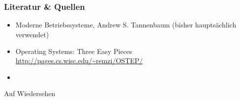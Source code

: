 \documentclass{beamer}
\begin{document}
	
	\section{}
	\begin{frame}
		\frametitle{Literatur \& Quellen}
		\begin{itemize}%
			\item Moderne Betriebssysteme, Andrew S. Tannenbaum (bisher hauptsächlich verwendet) 
			\item Operating Systems: Three Easy Pieces \\
				\url{http://pages.cs.wisc.edu/~remzi/OSTEP/}
			\item %
		\end{itemize}
	\end{frame}
	
	\begin{frame}
		\begin{center}
			\Huge{Auf Wiedersehen}
		\end{center}				
	\end{frame}
\end{document}
